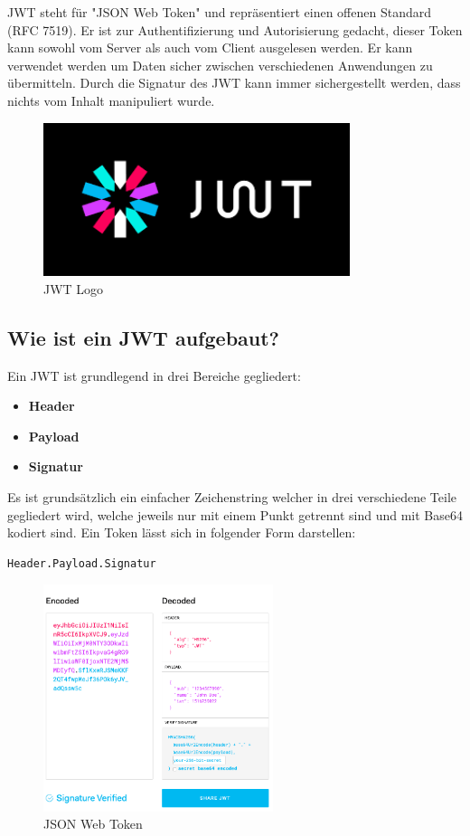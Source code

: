 JWT steht für "JSON Web Token" und repräsentiert einen offenen Standard (RFC 7519). Er ist zur Authentifizierung und Autorisierung gedacht, dieser Token kann sowohl vom Server als auch vom Client ausgelesen werden. Er kann verwendet werden um Daten sicher zwischen verschiedenen Anwendungen zu übermitteln. Durch die Signatur des JWT kann immer sichergestellt werden, dass nichts vom Inhalt manipuliert wurde.

\begin{figure}[h]
    \centering
    \includegraphics[width=0.8\textwidth]{pics/jwt-logo.png}
    \caption{JWT Logo}
\end{figure}


\subsection{Wie ist ein JWT aufgebaut?}
Ein JWT ist grundlegend in drei Bereiche gegliedert:

\begin{itemize}
\item \textbf{Header}
\item \textbf{Payload}
\item \textbf{Signatur}
\end{itemize}

Es ist grundsätzlich ein einfacher Zeichenstring welcher in drei verschiedene Teile gegliedert wird, welche jeweils nur mit einem Punkt getrennt sind und mit Base64 kodiert sind. Ein Token lässt sich in folgender Form darstellen:

\begin{lstlisting}
Header.Payload.Signatur
\end{lstlisting}


\begin{figure}[h!]
    \centering
    \includegraphics[width=0.6\textwidth]{pics/jwt.png}
    \caption{JSON Web Token}
    \label{fig:enter-label}
\end{figure}

